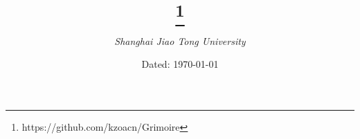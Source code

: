 \documentclass[titlepage, a4paper, openany]{book}
\title{\Huge{\textgoth{Grimoire's Standard Code Library}}\thanks{https://github.com/kzoacn/Grimoire}}
\author{\emph{Shanghai Jiao Tong University}}
\date{Dated: \today}
\begin{document}
	\maketitle
	\tableofcontents	\begin{spacing}{0.8}
		
	\end{spacing}
\end{document}
